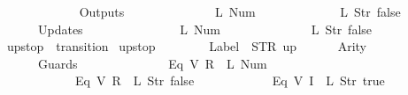 \begin{isabellebody}
\ \ \ \ \ \ {\isacharbrackright}{\isacharcomma}\isanewline
\ \ \ \ \ \ Outputs\ {\isacharequal}\ {\isacharbrackleft}\isanewline
\ \ \ \ \ \ \ \ \ \ \ \ {\isacharparenleft}L\ {\isacharparenleft}Num\ {}{\isacharparenright}{\isacharparenright}{\isacharcomma}\isanewline
\ \ \ \ \ \ \ \ \ \ \ \ {\isacharparenleft}L\ {\isacharparenleft}Str\ {\isacharprime}{\isacharprime}false{\isacharprime}{\isacharprime}{\isacharparenright}{\isacharparenright}\isanewline
\ \ \ \ \ \ {\isacharbrackright}{\isacharcomma}\isanewline
\ \ \ \ \ \ Updates\ {\isacharequal}\ {\isacharbrackleft}\isanewline
\ \ \ \ \ \ \ \ \ \ \ \ {\isacharparenleft}{}{\isacharcomma}\ {\isacharparenleft}L\ {\isacharparenleft}Num\ {}{\isacharparenright}{\isacharparenright}{\isacharparenright}{\isacharcomma}\isanewline
\ \ \ \ \ \ \ \ \ \ \ \ {\isacharparenleft}{}{\isacharcomma}\ {\isacharparenleft}L\ {\isacharparenleft}Str\ {\isacharprime}{\isacharprime}false{\isacharprime}{\isacharprime}{\isacharparenright}{\isacharparenright}{\isacharparenright}\isanewline
\ \ \ \ \ \ {\isacharbrackright}\isanewline
{\isasymrparr}{\isachardoublequoteclose}\isanewline
\isanewline
{}\isamarkupfalse%
\ {\isachardoublequoteopen}up{}{}stop{\isachardoublequoteclose}\ {\isacharcolon}{\isacharcolon}\ {\isachardoublequoteopen}transition{\isachardoublequoteclose}\ \isanewline
{\isachardoublequoteopen}up{}{}stop\ {\isasymequiv}\ {\isasymlparr}\isanewline
\ \ \ \ \ \ Label\ {\isacharequal}\ STR\ {\isacharprime}{\isacharprime}up{\isacharprime}{\isacharprime}{\isacharcomma}\isanewline
\ \ \ \ \ \ Arity\ {\isacharequal}\ {}{\isacharcomma}\isanewline
\ \ \ \ \ \ Guards\ {\isacharequal}\ {\isacharbrackleft}\isanewline
\ \ \ \ \ \ \ \ \ \ \ \ {\isacharparenleft}Eq\ {\isacharparenleft}V\ {\isacharparenleft}R\ {}{\isacharparenright}{\isacharparenright}\ {\isacharparenleft}L\ {\isacharparenleft}Num\ {}{\isacharparenright}{\isacharparenright}{\isacharparenright}{\isacharcomma}\isanewline
\ \ \ \ \ \ \ \ \ \ \ \ {\isacharparenleft}Eq\ {\isacharparenleft}V\ {\isacharparenleft}R\ {}{\isacharparenright}{\isacharparenright}\ {\isacharparenleft}L\ {\isacharparenleft}Str\ {\isacharprime}{\isacharprime}false{\isacharprime}{\isacharprime}{\isacharparenright}{\isacharparenright}{\isacharparenright}{\isacharcomma}\isanewline
\ \ \ \ \ \ \ \ \ \ \ \ {\isacharparenleft}Eq\ {\isacharparenleft}V\ {\isacharparenleft}I\ {}{\isacharparenright}{\isacharparenright}\ {\isacharparenleft}L\ {\isacharparenleft}Str\ {\isacharprime}{\isacharprime}true{\isacharprime}{\isacharprime}{\isacharparenright}{\isacharparenright}{\isacharparenright}{\isacharcomma}\isanewline

\end{isabellebody}
